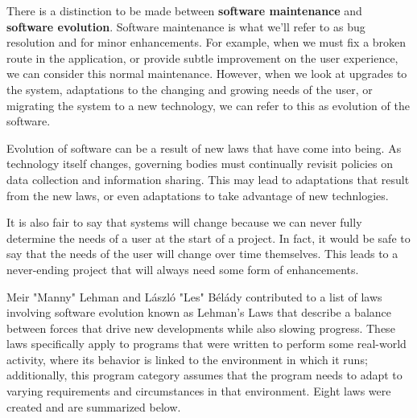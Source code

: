\documentclass[12pt,conference]{IEEEtran}
\begin{document}
There is a distinction to be made between \textbf{software maintenance} and \textbf{software evolution}. Software maintenance is what we'll refer to as bug resolution and for minor enhancements. For example, when we must fix a broken route in the application, or provide subtle improvement on the user experience, we can consider this normal maintenance. However, when we look at upgrades to the system, adaptations to the changing and growing needs of the user, or migrating the system to a new technology, we can refer to this as evolution of the software.

Evolution of software can be a result of new laws that have come into being. As technology itself changes, governing bodies must continually revisit policies on data collection and information sharing. This may lead to adaptations that result from the new laws, or even adaptations to take advantage of new technlogies.

It is also fair to say that systems will change because we can never fully determine the needs of a user at the start of a project. In fact, it would be safe to say that the needs of the user will change over time themselves. This leads to a never-ending project that will always need some form of enhancements.

Meir "Manny" Lehman and László "Les" Bélády contributed to a list of laws involving software evolution known as Lehman's Laws that describe a balance between forces that drive new developments while also slowing progress. These laws specifically apply to programs that were written to perform some real-world activity, where its behavior is linked to the environment in which it runs; additionally, this program category assumes that the program needs to adapt to varying requirements and circumstances in that environment. Eight laws were created and are summarized below.
\cite{wiki:lehmans-laws}
\end{document}
